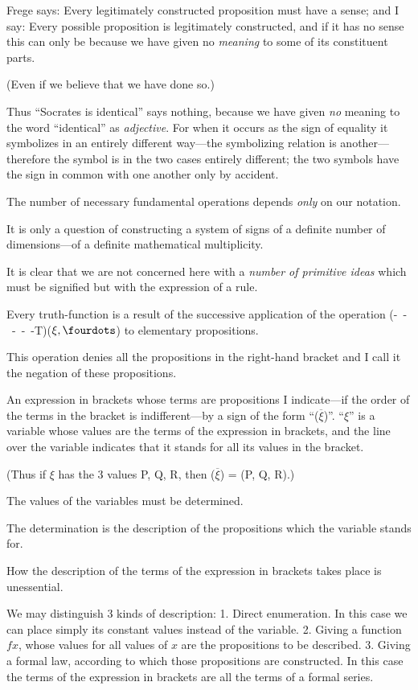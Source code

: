 {Frege says: Every legitimately constructed
proposition must have a sense; and I say: Every
possible proposition is legitimately constructed,
and if it has no sense this can only be because
we have given no \emph{meaning} to some of its constituent
parts.

(Even if we believe that we have done
so.)

Thus ``Socrates is identical'' says nothing,
because we have given \emph{no} meaning to the word
``identical'' as \emph{adjective}. For when it occurs as
the sign of equality it symbolizes in an entirely
different way---the symbolizing relation is another---therefore
the symbol is in the two cases entirely
different; the two symbols have the sign in
common with one another only by accident.}


{The number of necessary fundamental operations
depends \emph{only} on our notation.}


{It is only a question of constructing a system
of signs of a definite number of di\-men\-sions---of
a definite mathematical multiplicity.}


{It is clear that we are not concerned here with
a \emph{number of primitive ideas} which must be signified
but with the expression of a rule.}


{Every truth-function is a result of the successive
application of the operation \mbox{(- - - - -T)}\AllowBreak($\xi, \fourdots$) to
elementary propositions.

This operation denies all the propositions in
the right-hand bracket and I call it the negation
of these propositions.}


{An expression in brackets whose terms are
propositions I in\-di\-cate---if the order of the terms
in the bracket is indifferent---by a sign of the form
``($\overline{\xi}$)''. ``$\xi$'' is a variable whose values are the
terms of the expression in brackets, and the line
over the variable indicates that it stands for all
its values in the bracket.

(Thus if $\xi$ has the 3 values P, Q, R, then
($\overline{\xi}$) = (P, Q, R).)

The values of the variables must be determined.

{\stretchyspace
The determination is the description of the propositions
which the variable stands for.}

How the description of the terms of the expression
in brackets takes place is unessential.

We may distinguish 3 kinds of description:
1. Direct enumeration. In this case we can place
simply its constant values instead of the variable.
2. Giving a function $fx$, whose values for all
values of $x$ are the propositions to be described.
3. Giving a formal law, according to which those
propositions are constructed. In this case the
terms of the expression in brackets are all the
terms of a formal series.}


